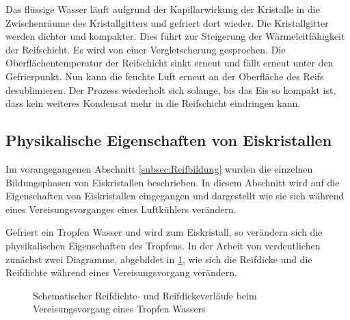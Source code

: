Das flüssige Wasser läuft aufgrund der Kapillarwirkung der Kristalle in die Zwischenräume des Kristallgitters und gefriert dort wieder. Die Kristallgitter werden dichter und kompakter. Dies führt zur Steigerung der Wärmeleitfähigkeit der Reifschicht. Es wird von einer Vergletscherung gesprochen. Die Oberflächentemperatur der Reifschicht sinkt erneut und fällt erneut unter den Gefrierpunkt. Nun kann die feuchte Luft erneut an der Oberfläche des Reifs desublimieren. Der Prozess wiederholt sich solange, bis das Eis so kompakt ist, dass kein weiteres Kondensat mehr in die Reifschicht eindringen kann. 

\subsection*{Physikalische Eigenschaften von Eiskristallen}

 Im vorangegangenen Abschnitt \ref{subsec:Reifbildung} wurden die einzelnen Bildungsphasen von Eiskristallen beschrieben. In diesem Abschnitt wird auf die Eigenschaften von Eiskristallen eingegangen und dargestellt wie sie sich während eines Vereisungsvorganges eines Luftkühlers verändern. 
 
Gefriert ein Tropfen Wasser und wird zum Eiskristall, so verändern sich die physikalischen Eigenschaften des Tropfens. In der Arbeit von \textsc{\citeauthor{Schydlo2010}} verdeutlichen zunächst zwei Diagramme, abgebildet in \ref{fig:Zeitverlaufe von Reifdichte und -dicke}, wie sich die Reifdicke und die Reifdichte während eines Vereisungsvorgang verändern. 

\begin{figure}
\centering
\caption{Schematischer Reifdichte- und Reifdickeverläufe beim Vereisungsvorgang eines Tropfen Wassers \citep{Schydlo2010}}
\label{fig:Zeitverlaufe von Reifdichte und -dicke}
\end{figure}

